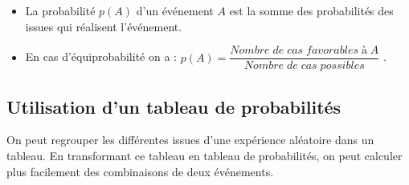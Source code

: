 \documentclass[12pt,a4paper]{article}
\begin{document}
\begin{myprops}
	\begin{itemize}
		 \item La probabilité $p(A)$ d'un événement $A$ est la somme des probabilités des issues qui réalisent l'événement.
		 \item En cas d'équiprobabilité on a : $p(A) = \dfrac{Nombre\;de\; cas\; favorables\; à\; A}{Nombre\; de\; cas\; possibles}$ .
	\end{itemize}
	
\end{myprops}







\subsection{Utilisation d'un tableau de probabilités}


\begin{mymeth}
	On peut regrouper les différentes issues d'une expérience aléatoire dans un tableau.
	En transformant ce tableau en tableau de probabilités, on peut calculer plus facilement des combinaisons de deux événements.
\end{mymeth}
\end{document}
